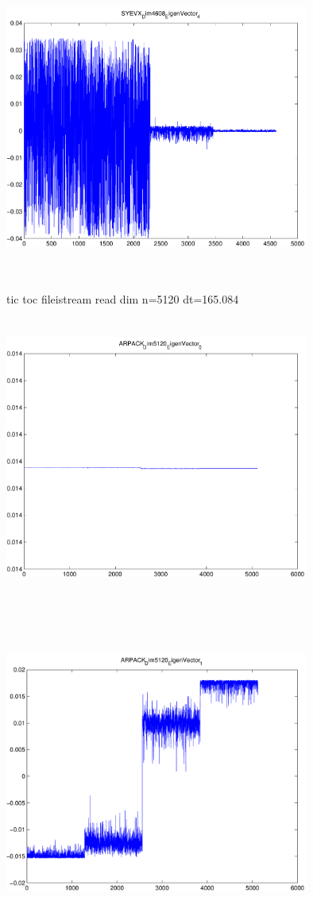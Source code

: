\documentclass[9pt]{article}
\theoremstyle{plain}
\theoremstyle{definition}
\theoremstyle{remark}
\numberwithin{equation}{section}
\begin{document}
\includegraphics[width=10.0cm,height=10.0cm]{SYEVX_Dim4608_EigenVector_4.pdf}

tic toc fileistream read dim n=5120 dt=165.084
\includegraphics[width=10.0cm,height=10.0cm]{ARPACK_Dim5120_EigenVector_0.pdf}

\includegraphics[width=10.0cm,height=10.0cm]{ARPACK_Dim5120_EigenVector_1.pdf}
\end{document}
